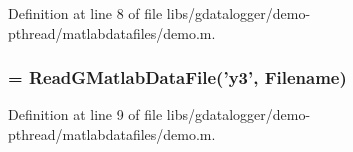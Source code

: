 Definition at line 8 of file libs/gdatalogger/demo-\/pthread/matlabdatafiles/demo.m.
\subsubsection[{y3}]{ = ReadGMatlabDataFile('{\bf y3}', {\bf Filename})}\label{libs_2gdatalogger_2demo-pthread_2matlabdatafiles_2demo_8m_ade1417f93b8addbf3d5a62e132e169fd}


Definition at line 9 of file libs/gdatalogger/demo-\/pthread/matlabdatafiles/demo.m.